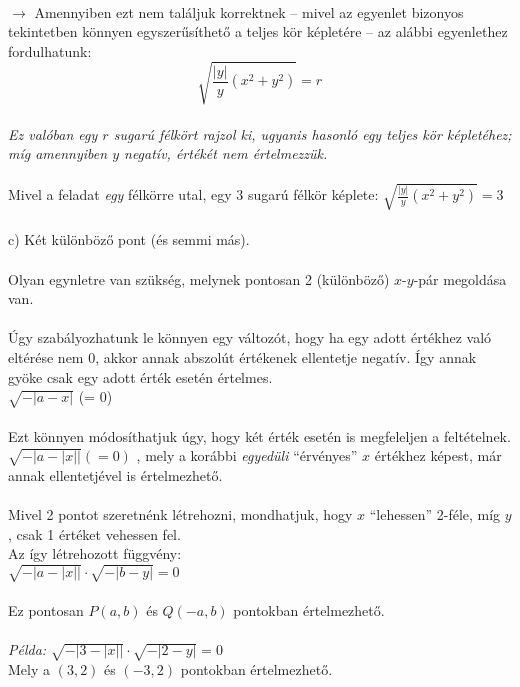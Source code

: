 \documentclass[a4paper,12pt]{article}
\begin{document}
\\ \indent \indent $\rightarrow$ Amennyiben ezt nem találjuk korrektnek -- mivel az egyenlet bizonyos tekintetben könnyen egyszerűsíthető a teljes kör képletére -- az alábbi egyenlethez fordulhatunk:
\\ $$\sqrt{\frac{|y|}{y}(x^2 + y^2)} = r$$
\\ \textit{Ez valóban egy $r$ sugarú félkört rajzol ki, ugyanis hasonló egy teljes kör képletéhez; míg amennyiben $y$ negatív, értékét nem értelmezzük.}
\\
\\ Mivel a feladat \textit{egy} félkörre utal, egy $3$ sugarú félkör képlete: $\sqrt{\frac{|y|}{y}(x^2 + y^2)} = 3$
\\
\\ c) Két különböző pont (és semmi más).
\\
\\ Olyan egynletre van szükség, melynek pontosan 2 (különböző) $x$-$y$-pár megoldása van.
\\
\\ Úgy szabályozhatunk le könnyen egy változót, hogy ha egy adott értékhez való eltérése nem $0$, akkor annak abszolút értékenek ellentetje negatív. Így annak gyöke csak egy adott érték esetén értelmes.
\\ $\sqrt{-|a-x|}$ (= 0)
\\
\\ Ezt könnyen módosíthatjuk úgy, hogy két érték esetén is megfeleljen a feltételnek.
\\ $\sqrt{-|a-|x||} (= 0)$ , mely a korábbi \textit{egyedüli} ``érvényes'' $x$ értékhez képest, már annak ellentetjével is értelmezhető.
\\
\\ Mivel 2 pontot szeretnénk létrehozni, mondhatjuk, hogy $x$ ``lehessen'' 2-féle, míg $y$, csak 1 értéket vehessen fel.
\\ Az így létrehozott függvény:
\\ \indent $\sqrt{-|a-|x||} \cdot \sqrt{-|b-y|} = 0$
\\ 
\\ \indent Ez pontosan $P(a, b)$ és $Q(-a, b)$ pontokban értelmezhető.
\\
\\ \textit{Példa:} $\sqrt{-|3-|x||} \cdot \sqrt{-|2-y|} = 0$
\\ \indent Mely a $(3, 2)$ és $(-3, 2)$ pontokban értelmezhető.
\\
\\
\\
\end{document}
